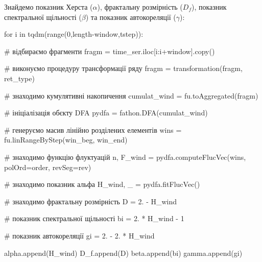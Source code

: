 \documentclass[
  letterpaper,
]{report}
\newenvironment{Shaded}{\begin{snugshade}}{\end{snugshade}}
\newcommand{\BuiltInTok}[1]{\textcolor[rgb]{0.00,0.23,0.31}{#1}}
\newcommand{\CommentTok}[1]{\textcolor[rgb]{0.37,0.37,0.37}{#1}}
\newcommand{\ControlFlowTok}[1]{\textcolor[rgb]{0.00,0.23,0.31}{#1}}
\newcommand{\DecValTok}[1]{\textcolor[rgb]{0.68,0.00,0.00}{#1}}
\newcommand{\FloatTok}[1]{\textcolor[rgb]{0.68,0.00,0.00}{#1}}
\newcommand{\KeywordTok}[1]{\textcolor[rgb]{0.00,0.23,0.31}{#1}}
\newcommand{\NormalTok}[1]{\textcolor[rgb]{0.00,0.23,0.31}{#1}}
\newcommand{\OperatorTok}[1]{\textcolor[rgb]{0.37,0.37,0.37}{#1}}
\begin{document}
Знайдемо показник Херста (\(\alpha\)), фрактальну розмірність (\(D_f\)),
показник спектральної щільності (\(\beta\)) та показник автокореляції
(\(\gamma\)):

\begin{Shaded}
\begin{Highlighting}[]
\ControlFlowTok{for}\NormalTok{ i }\KeywordTok{in}\NormalTok{ tqdm(}\BuiltInTok{range}\NormalTok{(}\DecValTok{0}\NormalTok{,length}\OperatorTok{{-}}\NormalTok{window,tstep)):}
    
    \CommentTok{\# відбираємо фрагменти}
\NormalTok{    fragm }\OperatorTok{=}\NormalTok{ time\_ser.iloc[i:i}\OperatorTok{+}\NormalTok{window].copy()  }

    \CommentTok{\# виконуємо процедуру трансформації ряду }
\NormalTok{    fragm }\OperatorTok{=}\NormalTok{ transformation(fragm, ret\_type)}

    \CommentTok{\# знаходимо кумулятивні накопичення}
\NormalTok{    cumulat\_wind }\OperatorTok{=}\NormalTok{ fu.toAggregated(fragm) }

    \CommentTok{\# ініціалізація об\textquotesingle{}єкту DFA}
\NormalTok{    pydfa }\OperatorTok{=}\NormalTok{ fathon.DFA(cumulat\_wind) }

    \CommentTok{\# генеруємо масив лінійно розділених елементів}
\NormalTok{    wins }\OperatorTok{=}\NormalTok{ fu.linRangeByStep(win\_beg, win\_end) }

    \CommentTok{\# знаходимо функцію флуктуацій}
\NormalTok{    n, F\_wind }\OperatorTok{=}\NormalTok{ pydfa.computeFlucVec(wins, polOrd}\OperatorTok{=}\NormalTok{order, revSeg}\OperatorTok{=}\NormalTok{rev)    }

    \CommentTok{\# знаходимо показник альфа}
\NormalTok{    H\_wind, \_ }\OperatorTok{=}\NormalTok{ pydfa.fitFlucVec()}

    \CommentTok{\# знаходимо фрактальну розмірність        }
\NormalTok{    D }\OperatorTok{=} \FloatTok{2.} \OperatorTok{{-}}\NormalTok{ H\_wind}

    \CommentTok{\# показник спектральної щільності}
\NormalTok{    bi }\OperatorTok{=} \FloatTok{2.} \OperatorTok{*}\NormalTok{ H\_wind }\OperatorTok{{-}} \DecValTok{1} 

    \CommentTok{\# показник автокореляції}
\NormalTok{    gi }\OperatorTok{=} \FloatTok{2.} \OperatorTok{{-}} \FloatTok{2.} \OperatorTok{*}\NormalTok{ H\_wind}

\NormalTok{    alpha.append(H\_wind)}
\NormalTok{    D\_f.append(D)}
\NormalTok{    beta.append(bi)}
\NormalTok{    gamma.append(gi)}
\end{Highlighting}
\end{Shaded}
\end{document}
